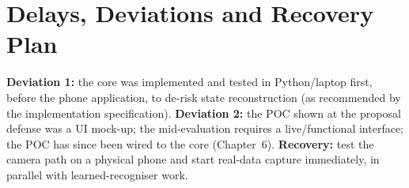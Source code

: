 \section{Delays, Deviations and Recovery Plan}
\textbf{Deviation 1:} the core was implemented and tested in Python/laptop first, before the phone application,
to de-risk state reconstruction (as recommended by the implementation specification). \textbf{Deviation 2:} the POC
shown at the proposal defense was a UI mock-up; the mid-evaluation requires a live/functional interface; the POC has since been wired to the core (Chapter~6). \textbf{Recovery:} test the camera path on a physical phone and start real-data capture
immediately, in parallel with learned-recogniser work.
